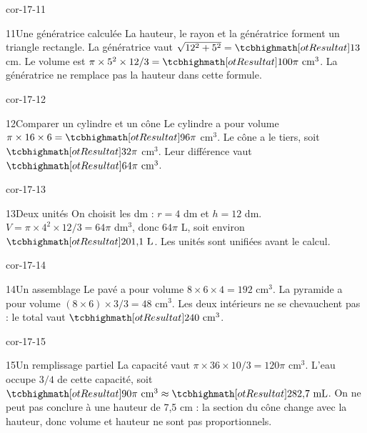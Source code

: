 \begin{blocLivre}{cor-17-11}\begin{corrige}{11}{Une génératrice calculée}
La hauteur, le rayon et la génératrice forment un triangle rectangle. La génératrice vaut $\sqrt{12^2+5^2}=\res{13}$ cm. Le volume est $\pi\times5^2\times12/3=\res{100\pi\ \mathrm{cm}^3}$. La génératrice ne remplace pas la hauteur dans cette formule.
\label{fig-cor-17-11}
\end{corrige}\end{blocLivre}
\begin{blocLivre}{cor-17-12}\begin{corrige}{12}{Comparer un cylindre et un cône}
Le cylindre a pour volume $\pi\times16\times6=\res{96\pi}$ cm$^3$. Le cône a le tiers, soit $\res{32\pi}$ cm$^3$. Leur différence vaut $\res{64\pi\ \mathrm{cm}^3}$.
\label{fig-cor-17-12}
\end{corrige}\end{blocLivre}
\begin{blocLivre}{cor-17-13}\begin{corrige}{13}{Deux unités}
On choisit les dm : $r=4$ dm et $h=12$ dm. $V=\pi\times4^2\times12/3=64\pi$ dm$^3$, donc $64\pi$ L, soit environ $\res{201{,}1\ \mathrm L}$. Les unités sont unifiées avant le calcul.
\label{fig-cor-17-13}
\end{corrige}\end{blocLivre}
\begin{blocLivre}{cor-17-14}\begin{corrige}{14}{Un assemblage}
Le pavé a pour volume $8\times6\times4=192$ cm$^3$. La pyramide a pour volume $(8\times6)\times3/3=48$ cm$^3$. Les deux intérieurs ne se chevauchent pas : le total vaut $\res{240\ \mathrm{cm}^3}$.
\label{fig-cor-17-14}
\end{corrige}\end{blocLivre}
\begin{blocLivre}{cor-17-15}\begin{corrige}{15}{Un remplissage partiel}
La capacité vaut $\pi\times36\times10/3=120\pi$ cm$^3$. L’eau occupe $3/4$ de cette capacité, soit $\res{90\pi\ \mathrm{cm}^3}\approx\res{282{,}7\ \mathrm{mL}}$. On ne peut pas conclure à une hauteur de 7,5 cm : la section du cône change avec la hauteur, donc volume et hauteur ne sont pas proportionnels.
\label{fig-cor-17-15}
\end{corrige}\end{blocLivre}
